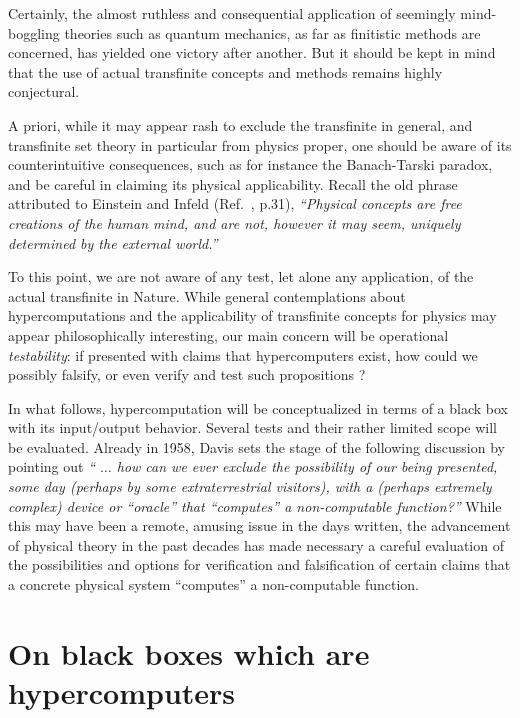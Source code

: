 \documentclass[12pt]{article}
\begin{document}
Certainly, the almost ruthless and consequential application of seemingly
mind-boggling theories
such as quantum mechanics, as  far as finitistic methods are concerned, has
yielded one victory after another.
But it should be kept in mind that the use of actual
transfinite concepts and methods remains highly conjectural.


A priori, while it may appear rash to exclude the transfinite in general, and transfinite set theory
in particular from physics proper,
one should be aware of its counterintuitive consequences, such as for instance
the Banach-Tarski paradox, and be careful in claiming its physical
applicability.
Recall the old phrase attributed to Einstein and Infeld
(Ref.~\cite{ein-in}, p.31),
{\em ``Physical concepts are free creations of the human
   mind, and are not, however it may seem,
   uniquely determined by the external world.''}

To this point, we are not aware of any test, let alone any application, of the actual
transfinite in Nature.
While general contemplations about hypercomputations and the applicability of transfinite concepts
for physics may appear philosophically interesting,
our main concern will be operational {\em testability}:
if presented with claims that hypercomputers exist, how could we possibly falsify, or even verify and test such propositions
\cite{Chow-2004}?

In what follows, hypercomputation will be conceptualized in terms of a black box with its input/output behavior.
Several tests and their rather limited scope will be evaluated.
Already in 1958, Davis \cite[p. 11]{davis-58}
sets the stage of the following discussion by pointing out
 {\em `` $\ldots$ how can we ever exclude the possibility of our being presented,
 some day (perhaps by some extraterrestrial visitors), with a (perhaps
 extremely complex) device or ``oracle'' that ``computes'' a
 non-computable function?''}
While this may have been a remote, amusing issue in the days written,
the advancement of physical theory in the past decades
has made necessary
a careful evaluation of the possibilities and options for
verification and falsification of certain claims that a concrete physical system
``computes''   a  non-computable function.



\section{On black boxes which are hypercomputers}
\end{document}
